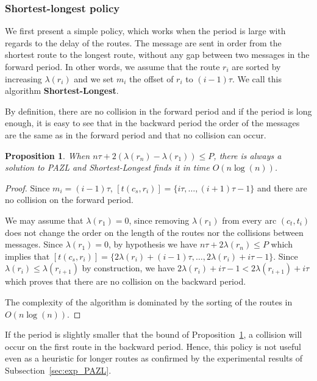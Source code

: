 \documentclass[a4paper,10pt]{article}
\newtheorem{proposition}{Proposition}
\begin{document}
    \subsubsection*{Shortest-longest policy}
    

    We first present a simple policy, which works when the period is large with regards to the delay of the routes.
    The message are sent in order from the shortest route to the longest route, without any gap between two messages in the forward period.
    In other words, we assume that the route $r_i$ are sorted by increasing $\lambda(r_i)$ and we set $m_{i}$ the offset of $r_i$ to $(i-1)\tau$. We call this algorithm {\bf Shortest-Longest}.
      
     By definition, there are no collision in the forward period and if the period is long enough, 
     it is easy to see that in the backward period the order of the messages are the same as in the forward period and that no collision can occur. 
      
      
      \begin{proposition} When $n\tau + 2(\lambda(r_{n}) - \lambda(r_{1})) \leq P$,
      there is always a solution to PAZL and Shortest-Longest finds it  in time $O(n\log(n))$.\label{prop:SL}
      \end{proposition}
      \begin{proof}
       Since $m_{i} = (i-1)\tau$, $[t(c_s,r_{i})] = \{i\tau,\dots, (i+1)\tau -1\}$ and there are no collision on the forward period.
       
       
       We may assume that $\lambda(r_{1}) = 0$, since removing $\lambda(r_{1})$ from every arc $(c_t,t_i)$ does not change the order on the length of the routes nor the collisions between messages.
       Since $\lambda(r_{1}) = 0$, by hypothesis we have $n\tau + 2\lambda(r_{n}) \leq P$ which implies that
       $[t(c_s,r_{i})] = \{2 \lambda(r_{i}) + (i-1)\tau, \dots,  2 \lambda(r_{i}) + i\tau -1\}$.
       Since $ \lambda(r_{i}) \leq  \lambda(r_{i+1})$ by construction, we have  $2 \lambda(r_{i}) + i\tau -1 < 2 \lambda(r_{i+1}) + i\tau$ which proves that there are no collision on the backward period. 
       
       The complexity of the algorithm is dominated by the sorting of the routes in $O(n\log(n))$. 
      \end{proof}

      If the period is slightly smaller that the bound of Proposition~\ref{prop:SL}, a collision will occur on the first route in the backward period. Hence, this policy is not useful even as a heuristic for longer routes as confirmed by the experimental results of Subsection~\ref{sec:exp_PAZL}. 
\end{document}
